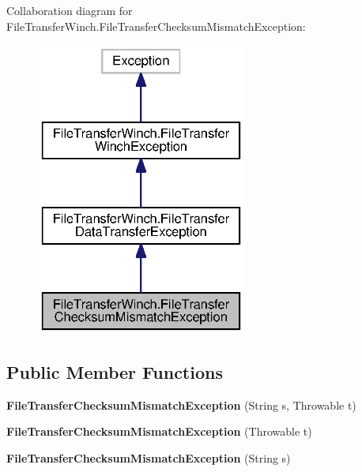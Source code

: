 Collaboration diagram for File\+Transfer\+Winch.\+File\+Transfer\+Checksum\+Mismatch\+Exception\+:\nopagebreak
\begin{figure}[H]
\begin{center}
\leavevmode
\includegraphics[width=196pt]{classorg_1_1smallfoot_1_1filexfer_1_1FileTransferWinch_1_1FileTransferChecksumMismatchException__coll__graph}
\end{center}
\end{figure}
\subsection*{Public Member Functions}
\begin{DoxyCompactItemize}
\item 
{\bfseries File\+Transfer\+Checksum\+Mismatch\+Exception} (String s, Throwable t)\label{classorg_1_1smallfoot_1_1filexfer_1_1FileTransferWinch_1_1FileTransferChecksumMismatchException_a68f39ff221119291117ba025fbaf6b48}

\item 
{\bfseries File\+Transfer\+Checksum\+Mismatch\+Exception} (Throwable t)\label{classorg_1_1smallfoot_1_1filexfer_1_1FileTransferWinch_1_1FileTransferChecksumMismatchException_a8c8c31fd8e685938b30b756523b56f09}

\item 
{\bfseries File\+Transfer\+Checksum\+Mismatch\+Exception} (String s)\label{classorg_1_1smallfoot_1_1filexfer_1_1FileTransferWinch_1_1FileTransferChecksumMismatchException_ae18c6b90199429c6b6b4dadd5f3f58ab}

\end{DoxyCompactItemize}


